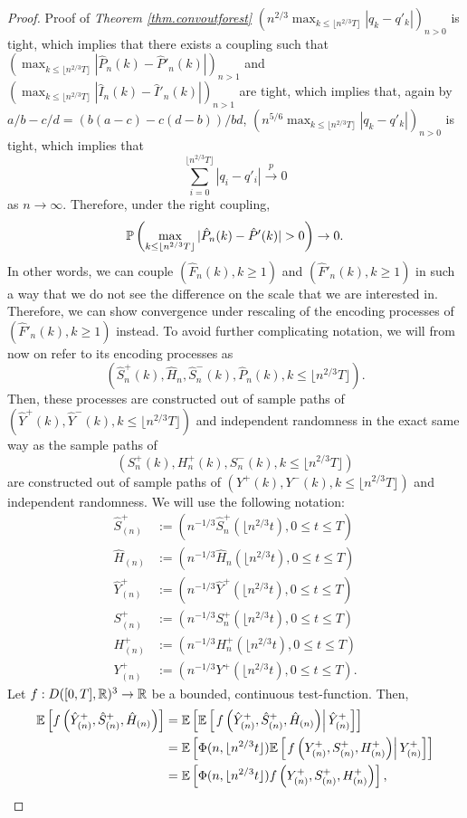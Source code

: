 \begin{proof}{Proof of \emph{Theorem \ref{thm.convoutforest}}}
$\left(n^{2/3}\max_{k\leq \lfloor n^{2/3}T\rfloor }|q_k-q'_k|\right)_{n>0}$ is tight, which implies that there exists a coupling such that $\left(\max_{k\leq \lfloor n^{2/3}T\rfloor } |\hat{P}_n(k)-\hat{P}'_n(k)|\right)_{n>1}$ and $\left(\max_{k\leq \lfloor n^{2/3}T\rfloor } |\hat{I}_n(k)-\hat{I}'_n(k)|\right)_{n>1}$ are tight, which implies that, again by $a/b-c/d=(b(a-c)-c(d-b))/bd$, 
$\left(n^{5/6}\max_{k\leq \lfloor n^{2/3}T\rfloor }|q_k-q'_k|\right)_{n>0}$ is tight, which implies that 
$$\sum_{i=0}^{\lfloor n^{2/3}T\rfloor }|q_i-q'_i|\overset{p}{\to}0$$
as $n\to \infty$. 
Therefore, under the right coupling, 
$$\P\left(\max_{k\leq \lfloor n^{2/3} T \rfloor}|\hat{P}_n(k)-\hat{P}'(k)|>0\right)\to 0.$$
In other words, we can couple $(\hat{F}_n(k),k\geq 1)$ and $(\hat{F}'_n(k),k\geq 1)$ in such a way that we do not see the difference on the scale that we are interested in. Therefore, we can show convergence under rescaling of the encoding processes of $(\hat{F}'_n(k),k\geq 1)$ instead. To avoid further complicating notation, we will from now on refer to its encoding processes as $$(\hat{S}^{+}_n(k),\hat{H}_n, \hat{S}^-_n(k), \hat{P}_n(k),k\leq \lfloor n^{2/3}T\rfloor).$$ Then, these processes are constructed out of sample paths of $(\hat{Y}^+(k),\hat{Y}^-(k), k\leq \lfloor n^{2/3}T\rfloor )$ and independent randomness in the exact same way as the sample paths of $$({S}_n^{+}(k),{H}_n^+(k),{S}_n^-(k), k \leq \lfloor n^{2/3}T\rfloor )$$ are constructed out of sample paths of $(Y^+(k),Y^-(k), k\leq \lfloor n^{2/3}T\rfloor )$ and independent randomness. 
We will use the following notation:\begin{align*}
    \hat{S}^{+}_{(n)}&:=\left(n^{-1/3}\hat{S}^{+}_n\left(\lfloor n^{2/3} t \right),0\leq t \leq T\right)\\
    \hat{H}_{(n)}&:=\left(n^{-1/3}\hat{H}_n\left(\lfloor n^{2/3} t \right),0\leq t \leq T\right)\\
    \hat{Y}^+_{(n)}&:=\left(n^{-1/3}\hat{Y}^+\left(\lfloor n^{2/3} t \right),0\leq t \leq T\right)\\
     {S}^{+}_{(n)}&:=\left(n^{-1/3}{S}^{+}_n\left(\lfloor n^{2/3} t \right),0\leq t \leq T\right)\\
    {H}^+_{(n)}&:=\left(n^{-1/3}{H}^+_n\left(\lfloor n^{2/3} t \right),0\leq t \leq T\right)\\
    {Y}^+_{(n)}&:=\left(n^{-1/3}{Y}^+\left(\lfloor n^{2/3} t \right),0\leq t \leq T\right).
\end{align*}
Let $f:D([0,T],{\mathbb R})^3\to {\mathbb R}$ be a bounded, continuous test-function. Then,
\begin{align*}{\mathbb E}\left[f\left(\hat{Y}^+_{(n)}, \hat{S}^+_{(n)},  \hat{H}_{(n)}\right) \right]&= {\mathbb E}\left[ {\mathbb E}\left[\left. f\left(\hat{Y}^+_{(n)},\hat{S}^+_{(n)},  \hat{H}_{(n)}\right)\right|\hat{Y}^+_{(n)}\right]\right]\\&={\mathbb E}\left[ \Phi(n,\lfloor n^{2/3} t\rfloor){\mathbb E}\left[\left.f\left(Y^+_{(n)}, S^+_{(n)},  H^+_{(n)}\right)\right| {Y}^+_{(n)}\right]\right]\\&={\mathbb E}\left[ \Phi(n,\lfloor n^{2/3} t\rfloor)f\left(Y^+_{(n)},S^+_{(n)},  H^+_{(n)}\right)\right],\end{align*}

\end{proof}
